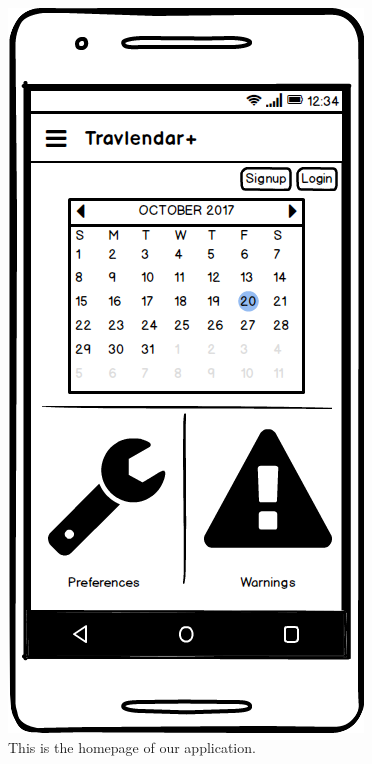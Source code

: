 \documentclass[11pt]{article}
\begin{document}
	\begin{figure}
		\centering
		\includegraphics[width=0.7\linewidth]{Homepage.png}
		\caption{This is the homepage of our application.}
		\label{fig:homepage}
	\end{figure}
\end{document}
